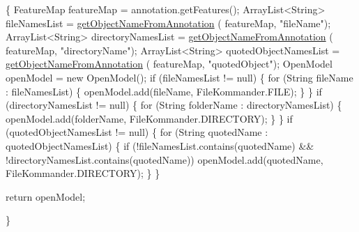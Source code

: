 \begin{DoxyCode}
                                                                               
      \{
        FeatureMap featureMap = annotation.getFeatures();
        ArrayList<String> fileNamesList = \hyperlink{classcom_1_1poly_1_1nlp_1_1filekommander_1_1file_1_1actions_1_1_analyse_action_a8652e1bba48585a8c416e6e212fe4766}{getObjectNameFromAnnotation}
      (
                featureMap, \textcolor{stringliteral}{"fileName"});
        ArrayList<String> directoryNamesList = \hyperlink{classcom_1_1poly_1_1nlp_1_1filekommander_1_1file_1_1actions_1_1_analyse_action_a8652e1bba48585a8c416e6e212fe4766}{getObjectNameFromAnnotation}
      (
                featureMap, \textcolor{stringliteral}{"directoryName"});
        ArrayList<String> quotedObjectNamesList = \hyperlink{classcom_1_1poly_1_1nlp_1_1filekommander_1_1file_1_1actions_1_1_analyse_action_a8652e1bba48585a8c416e6e212fe4766}{getObjectNameFromAnnotation}
      (
                featureMap, \textcolor{stringliteral}{"quotedObject"});
        OpenModel openModel = \textcolor{keyword}{new} OpenModel();
        \textcolor{keywordflow}{if} (fileNamesList != null) \{
            \textcolor{keywordflow}{for} (String fileName : fileNamesList) \{
                openModel.add(fileName, FileKommander.FILE);
            \}
        \}
        \textcolor{keywordflow}{if} (directoryNamesList != null) \{
            \textcolor{keywordflow}{for} (String folderName : directoryNamesList) \{
                openModel.add(folderName, FileKommander.DIRECTORY);
            \}
        \}
        \textcolor{keywordflow}{if} (quotedObjectNamesList != null) \{
            \textcolor{keywordflow}{for} (String quotedName : quotedObjectNamesList) \{
                \textcolor{keywordflow}{if} (!fileNamesList.contains(quotedName)
                        && !directoryNamesList.contains(quotedName))
                    openModel.add(quotedName, FileKommander.DIRECTORY);
            \}
        \}

        \textcolor{keywordflow}{return} openModel;

    \}
\end{DoxyCode}
